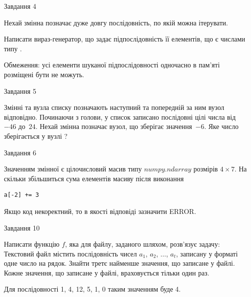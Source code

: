 \documentclass[12pt, ukrainian]{article}
\begin{document}
{               
{\begin{center}Завдання {4}\end{center}}
\vspace{-6mm}
Нехай змінна  позначає дуже довгу послідовність, по якій можна ітерувати.

Написати вираз-генератор, що задає підпослідовність її елементів, що є числами типу .

Обмеження: усі елементи шуканої підпослідовності одночасно в пам'яті розміщені бути не можуть.\par

\vspace{10mm}
               
{\begin{center}Завдання {5}\end{center}}
\vspace{-6mm}
Змінні  та  вузла списку позначають наступний та попередній за ним вузол відповідно. Починаючи з голови, у список записано послідовні цілі числа від~$-46$ до~$24$. Нехай змінна  позначає вузол, що зберігає значення~$-6$.
Яке число зберігається у вузлі  ?\par

               
{\begin{center}Завдання {6}\end{center}}
\vspace{-6mm}
Значенням змінної  є цілочисловий масив типу $numpy.ndarray$ розмірів $4{\times}7$. На скільки збільшиться сума елементів масиву  після виконання
\begin{verbatim}
a[-2] += 3
\end{verbatim}


Якщо код некоректний, то в якості відповіді зазначити ERROR.\par

               
{\begin{center}Завдання {10}\end{center}}
\vspace{-6mm}

Написати функцію $f$, яка для файлу, заданого шляхом, розв’язує задачу:\\ Текстовий файл містить послідовність чисел $a_1$, $a_2$, $\ldots$, $a_t$, записану у форматі одне число на рядок. Знайти третє найменше значення, що записане у файлі. Кожне значення, що записане у файлі, враховується тільки один раз. \par
Для послідовності 1, 4, 12, 5, 1, 0 таким значенням буде 4.

}
\end{document}
